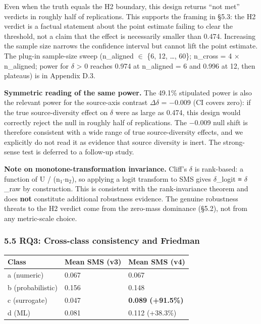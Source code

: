 \documentclass[review,12pt,authoryear]{elsarticle}
\newcounter{none}                   %
\begin{document}
Even when the truth equals the H2 boundary, this design returns ``not
met'' verdicts in roughly half of replications. This supports the
framing in §5.3: the H2 verdict is a factual statement about the point
estimate failing to clear the threshold, not a claim that the effect is
necessarily smaller than 0.474. Increasing the sample size narrows the
confidence interval but cannot lift the point estimate. The plug-in
sample-size sweep (n\_aligned $\in$ \{6, 12, \ldots, 60\}; n\_cross = 4 $\times$
n\_aligned; power for $\delta$ \textgreater{} 0 reaches 0.974 at n\_aligned = 6
and 0.996 at 12, then plateaus) is in Appendix D.3.

\textbf{Symmetric reading of the same power.} The 49.1\% stipulated
power is also the relevant power for the source-axis contrast $\Delta$$\delta$ =
−0.009 (CI covers zero): if the true source-diversity effect on $\delta$ were
as large as 0.474, this design would correctly reject the null in
roughly half of replications. The −0.009 null shift is therefore
consistent with a wide range of true source-diversity effects, and we
explicitly do not read it as evidence that source diversity is inert.
The strong-sense test is deferred to a follow-up study.

\textbf{Note on monotone-transformation invariance.} Cliff's $\delta$ is
rank-based: a function of U / (n$_{1}$$\cdot$n$_{2}$), so applying a logit transform to
SMS gives $\delta$\_logit ≡ $\delta$\_raw by construction. This is consistent with the
rank-invariance theorem and does \textbf{not} constitute additional
robustness evidence. The genuine robustness threats to the H2 verdict
come from the zero-mass dominance (§5.2), not from any metric-scale
choice.

\subsubsection{5.5 RQ3: Cross-class consistency and
Friedman}\label{rq3-cross-class-consistency-and-friedman}

{\def\LTcaptype{none} %
\begin{longtable}[]{@{}lll@{}}
\toprule\noalign{}
Class & Mean SMS (v3) & Mean SMS (v4) \\
\midrule\noalign{}
\endhead
\bottomrule\noalign{}
\endlastfoot
a (numeric) & 0.067 & 0.067 \\
b (probabilistic) & 0.156 & 0.148 \\
c (surrogate) & 0.047 & \textbf{0.089 (+91.5\%)} \\
d (ML) & 0.081 & 0.112 (+38.3\%) \\
\end{longtable}
}
\end{document}
